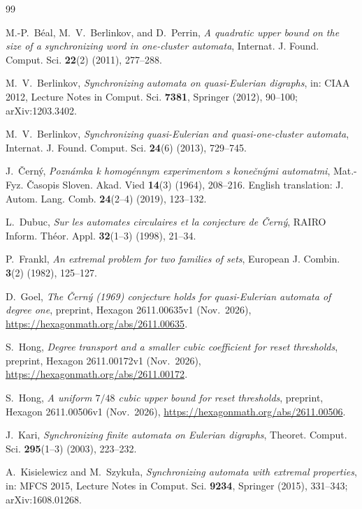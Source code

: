 \documentclass[11pt,a4paper]{article}
\theoremstyle{definition}
\theoremstyle{remark}
\begin{document}
\begin{thebibliography}{99}

M.-P.~B\'eal, M.~V.~Berlinkov, and D.~Perrin, \emph{A quadratic upper bound on the size of a synchronizing word in one-cluster automata}, Internat. J. Found. Comput. Sci. \textbf{22}(2) (2011), 277--288.

M.~V.~Berlinkov, \emph{Synchronizing automata on quasi-Eulerian digraphs}, in: CIAA 2012, Lecture Notes in Comput. Sci. \textbf{7381}, Springer (2012), 90--100; arXiv:1203.3402.

M.~V.~Berlinkov, \emph{Synchronizing quasi-Eulerian and quasi-one-cluster automata}, Internat. J. Found. Comput. Sci. \textbf{24}(6) (2013), 729--745.

J.~\v{C}ern\'y, \emph{Pozn\'amka k homog\'ennym experimentom s kone\v{c}n\'ymi automatmi}, Mat.-Fyz. \v{C}asopis Sloven. Akad. Vied \textbf{14}(3) (1964), 208--216. English translation: J. Autom. Lang. Comb. \textbf{24}(2--4) (2019), 123--132.

L.~Dubuc, \emph{Sur les automates circulaires et la conjecture de \v{C}ern\'y}, RAIRO Inform. Th\'eor. Appl. \textbf{32}(1--3) (1998), 21--34.

P.~Frankl, \emph{An extremal problem for two families of sets}, European J. Combin. \textbf{3}(2) (1982), 125--127.

D.~Goel, \emph{The \v{C}ern\'y (1969) conjecture holds for quasi-Eulerian automata of degree one}, preprint, Hexagon 2611.00635v1 (Nov.\ 2026), \url{https://hexagonmath.org/abs/2611.00635}.

S.~Hong, \emph{Degree transport and a smaller cubic coefficient for reset thresholds}, preprint, Hexagon 2611.00172v1 (Nov.\ 2026), \url{https://hexagonmath.org/abs/2611.00172}.

S.~Hong, \emph{A uniform $7/48$ cubic upper bound for reset thresholds}, preprint, Hexagon 2611.00506v1 (Nov.\ 2026), \url{https://hexagonmath.org/abs/2611.00506}.

J.~Kari, \emph{Synchronizing finite automata on Eulerian digraphs}, Theoret. Comput. Sci. \textbf{295}(1--3) (2003), 223--232.

A.~Kisielewicz and M.~Szyku\l a, \emph{Synchronizing automata with extremal properties}, in: MFCS 2015, Lecture Notes in Comput. Sci. \textbf{9234}, Springer (2015), 331--343; arXiv:1608.01268.


\end{thebibliography}
\end{document}
